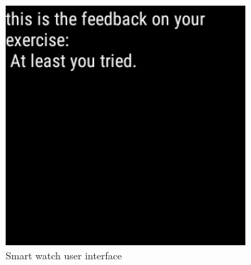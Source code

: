 \begin{figure}[b!]
\begin{minipage}{0.20\textwidth}
    \end{minipage}
    \begin{minipage}{0.20\textwidth}
      \centering
        \includegraphics[width=0.80\textwidth]{00_resources/figures/Android_Watch_FeedbackView.png}
    \end{minipage}
  \caption{Smart watch user interface}
  \label{fig:smwui}
\end{figure}
